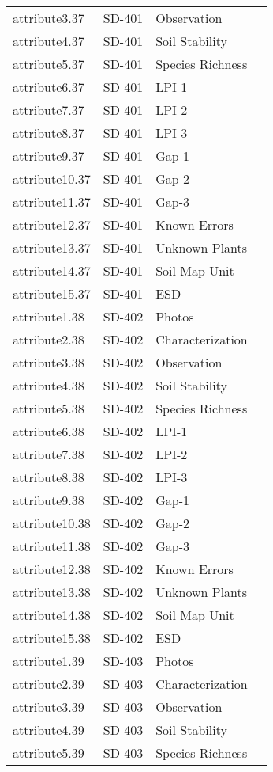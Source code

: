 \documentclass[
]{article}
\begin{document}
\begin{longtable}[]{@{}llll@{}}
attribute3.37 & SD-401 & Observation & \\
attribute4.37 & SD-401 & Soil Stability & \\
attribute5.37 & SD-401 & Species Richness & \\
attribute6.37 & SD-401 & LPI-1 & \\
attribute7.37 & SD-401 & LPI-2 & \\
attribute8.37 & SD-401 & LPI-3 & \\
attribute9.37 & SD-401 & Gap-1 & \\
attribute10.37 & SD-401 & Gap-2 & \\
attribute11.37 & SD-401 & Gap-3 & \\
attribute12.37 & SD-401 & Known Errors & \\
attribute13.37 & SD-401 & Unknown Plants & \\
attribute14.37 & SD-401 & Soil Map Unit & \\
attribute15.37 & SD-401 & ESD & \\
attribute1.38 & SD-402 & Photos & \\
attribute2.38 & SD-402 & Characterization & \\
attribute3.38 & SD-402 & Observation & \\
attribute4.38 & SD-402 & Soil Stability & \\
attribute5.38 & SD-402 & Species Richness & \\
attribute6.38 & SD-402 & LPI-1 & \\
attribute7.38 & SD-402 & LPI-2 & \\
attribute8.38 & SD-402 & LPI-3 & \\
attribute9.38 & SD-402 & Gap-1 & \\
attribute10.38 & SD-402 & Gap-2 & \\
attribute11.38 & SD-402 & Gap-3 & \\
attribute12.38 & SD-402 & Known Errors & \\
attribute13.38 & SD-402 & Unknown Plants & \\
attribute14.38 & SD-402 & Soil Map Unit & \\
attribute15.38 & SD-402 & ESD & \\
attribute1.39 & SD-403 & Photos & \\
attribute2.39 & SD-403 & Characterization & \\
attribute3.39 & SD-403 & Observation & \\
attribute4.39 & SD-403 & Soil Stability & \\
attribute5.39 & SD-403 & Species Richness & \\

\end{longtable}
\end{document}
